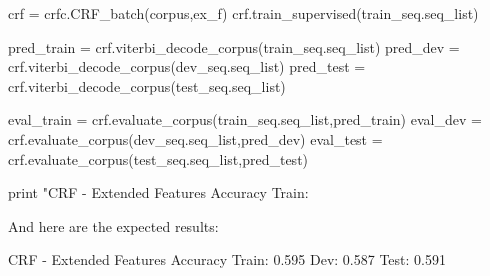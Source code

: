 \begin{exercise}
\begin{python}
crf = crfc.CRF_batch(corpus,ex_f)
crf.train_supervised(train_seq.seq_list)

pred_train = crf.viterbi_decode_corpus(train_seq.seq_list)
pred_dev = crf.viterbi_decode_corpus(dev_seq.seq_list)
pred_test = crf.viterbi_decode_corpus(test_seq.seq_list)

eval_train = crf.evaluate_corpus(train_seq.seq_list,pred_train)
eval_dev = crf.evaluate_corpus(dev_seq.seq_list,pred_dev)
eval_test = crf.evaluate_corpus(test_seq.seq_list,pred_test)

print "CRF - Extended Features Accuracy Train: %
\end{python}

And here are the expected results:
\begin{python}
CRF - Extended Features Accuracy Train: 0.595 Dev: 0.587 Test: 0.591
\end{python}

\end{exercise}

